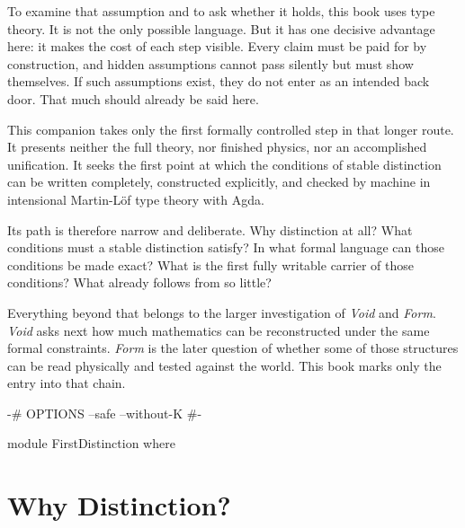 \documentclass[11pt,a4paper]{book}
\begin{document}
To examine that assumption and to ask whether it holds, this book uses type
theory. It is not the only possible language. But it has one decisive
advantage here: it makes the cost of each step visible. Every claim must be
paid for by construction, and hidden assumptions cannot pass silently but
must show themselves. If such assumptions exist, they do not enter as an
intended back door. That much should already be said here.

This companion takes only the first formally controlled step in that longer
route. It presents neither the full theory, nor finished physics, nor an
accomplished unification. It seeks the first point at which the conditions
of stable distinction can be written completely, constructed explicitly, and
checked by machine in intensional Martin-L\"of type theory with Agda.

Its path is therefore narrow and deliberate. Why distinction at all? What
conditions must a stable distinction satisfy? In what formal language can
those conditions be made exact? What is the first fully writable carrier of
those conditions? What already follows from so little?

Everything beyond that belongs to the larger investigation of \textit{Void}
and \textit{Form}. \textit{Void} asks next how much mathematics can be
reconstructed under the same formal constraints. \textit{Form} is the later
question of whether some of those structures can be read physically and
tested against the world. This book marks only the entry into that chain.

\tableofcontents

\mainmatter


\begin{code}[hide]
{-# OPTIONS --safe --without-K #-}

module FirstDistinction where
\end{code}

\chapter{Why Distinction?}
\label{ch:origin-question}
\end{document}
